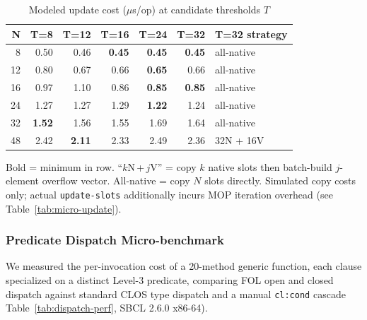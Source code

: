 \documentclass[sigconf,nonacm]{acmart}
\begin{document}
\begin{table}[htbp]
\small
\caption{Modeled update cost ($\mu$s/op) at candidate thresholds $T$}
\label{tab:threshold-update}
\begin{threeparttable}
\begin{tabular}{rrrrrrl}
\toprule
\textbf{N} & \textbf{T=8} & \textbf{T=12} & \textbf{T=16} & \textbf{T=24} & \textbf{T=32} & \textbf{T=32 strategy} \\
\midrule
 8 & 0.50 & 0.46 & \textbf{0.45} & \textbf{0.45} & \textbf{0.45} & all-native \\
12 & 0.80 & 0.67 & 0.66 & \textbf{0.65} & 0.66 & all-native \\
16 & 0.97 & 1.10 & 0.86 & \textbf{0.85} & \textbf{0.85} & all-native \\
24 & 1.27 & 1.27 & 1.29 & \textbf{1.22} & 1.24 & all-native \\
32 & \textbf{1.52} & 1.56 & 1.55 & 1.69 & 1.64 & all-native \\
48 & 2.42 & \textbf{2.11} & 2.33 & 2.49 & 2.36 & 32N + 16V \\
\bottomrule
\end{tabular}
\begin{tablenotes}
  \footnotesize
  \item Bold = minimum in row. ``$k$N\,+\,$j$V'' = copy $k$ native slots then
        batch-build $j$-element overflow vector. All-native = copy $N$ slots directly.
        Simulated copy costs only; actual \texttt{update-slots} additionally incurs MOP
        iteration overhead (see Table~\ref{tab:micro-update}).
\end{tablenotes}
\end{threeparttable}
\end{table}

\subsubsection{Predicate Dispatch Micro-benchmark}
\label{sec:predbench}

We measured the per-invocation cost of a 20-method generic function, each clause specialized on a distinct Level-3 predicate, comparing FOL open and closed dispatch against standard CLOS type dispatch and a manual \texttt{cl:cond} cascade 
Table~\ref{tab:dispatch-perf}, SBCL 2.6.0 x86-64).
\end{document}
